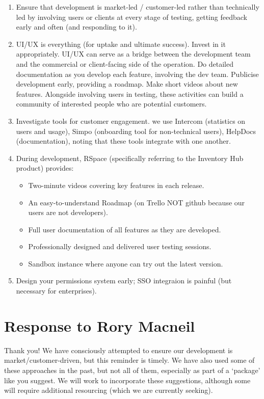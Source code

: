 \documentclass[a4paper,headings=small fontsize=10pt]{scrreprt}
\begin{document}
\begin{enumerate}
  \def\labelenumii{\alph{enumii}.}
  
\item Ensure that development is market-led / customer-led rather than technically led by 
   involving users or clients at every stage of testing, getting feedback early and often 
   (and responding to it). 
   
\item UI/UX is everything (for uptake and ultimate success). Invest in it appropriately. UI/UX can serve as a bridge 
   between the development team and the commercial or client-facing side of the operation.
   Do detailed documentation as you develop each feature, involving the dev team. Publicise
   development early, providing a roadmap. Make short videos about new features. 
   Alongside involving users in testing, these activities
   can build a community of interested people who are potential customers. 
   
\item Investigate tools for customer engagement. we use Intercom (statistics on users and usage),
   Simpo (onboarding tool for non-technical users), HelpDocs (documentation), noting that these tools 
   integrate with one another.
   
\item During development, RSpace (specifically referring to the Inventory Hub product) provides:
   \begin{itemize}
     \item Two-minute videos covering key features in each release.
     \item An easy-to-understand Roadmap (on Trello NOT github because our users are not developers).
     \item Full user documentation of all features as they are developed.
     \item Professionally designed and delivered user testing sessions.
     \item Sandbox instance where anyone can try out the latest version.
   \end{itemize}
\item Design your permissions system early; SSO integraion is painful (but necessary for enterprises).

\end{enumerate}

\section{Response to Rory Macneil}

   Thank you! We have consciously attempted to ensure our 
   development is market/customer-driven, but this reminder is timely. We have also 
   used some of these approaches in the past, but not all of them, especially as part of a `package' like 
   you suggest. We will work to incorporate these suggestions, although some will require additional 
   resourcing (which we are currently seeking).
   
\end{document}
